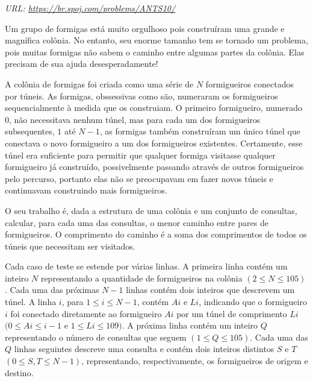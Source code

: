 {

\textit{URL: \url{https://br.spoj.com/problems/ANTS10/}}

\vspace{0.3cm}

\begin{mdframed}[backgroundcolor=blue!5]
\vspace{-0.5cm}

\vspace{0.2cm}

Um grupo de formigas está muito orgulhoso pois construíram uma grande e magnífica colônia. No entanto, seu enorme tamanho tem se tornado um problema, pois muitas formigas não sabem o caminho entre algumas partes da colônia. Elas precisam de sua ajuda desesperadamente!

A colônia de formigas foi criada como uma série de $N$ formigueiros conectados por túneis. As formigas, obssessivas como são, numeraram os formigueiros sequencialmente à medida que os construiam. O primeiro formigueiro, numerado $0$, não necessitava nenhum túnel, mas para cada um dos formigueiros subsequentes, $1$ até $N-1$, as formigas também construíram um único túnel que conectava o novo formigueiro a um dos formigueiros existentes. Certamente, esse túnel era suficiente para permitir que qualquer formiga visitasse qualquer formigueiro já construído, possivelmente passando através de outros formigueiros pelo percurso, portanto elas não se preocupavam em fazer novos túneis e continuavam construindo mais formigueiros.

O seu trabalho é, dada a estrutura de uma colônia e um conjunto de consultas, calcular, para cada uma das consultas, o menor caminho entre pares de formigueiros. O comprimento do caminho é a soma dos comprimentos de todos os túneis que necessitam ser visitados.

\vspace{0.2cm}

Cada caso de teste se estende por várias linhas. A primeira linha contém um inteiro $N$ representando a quantidade de formigueiros na colônia $(2 \leq N \leq 105)$. Cada uma das próximas $N-1$ linhas contém dois inteiros que descrevem um túnel. A linha $i$, para $1 \leq i \leq N-1$, contém $Ai$ e $Li$, indicando que o formigueiro $i$ foi conectado diretamente ao formigueiro $Ai$ por um túnel de comprimento $Li$ $(0 \leq Ai\leq i-1$ e $1 \leq Li \leq 109)$. A próxima linha contém um inteiro $Q$ representando o número de consultas que seguem $(1 \leq Q \leq 105)$. Cada uma das $Q$ linhas seguintes descreve uma consulta e contém dois inteiros distintos $S$ e $T$ $(0 \leq S,T \leq N-1)$, representando, respectivamente, os formigueiros de origem e destino.


\end{mdframed}}
